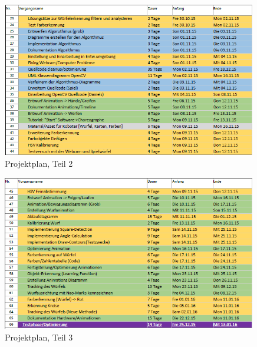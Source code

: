 \begin{appendix}
            \begin{figure}[ht]
                \centering
                \includegraphics[width=0.99\textwidth]{src/pictures/planung2.png}
                \caption{Projektplan, Teil 2}
                \label{img:planung2}
            \end{figure}

            \begin{figure}[ht]
                \centering
                \includegraphics[width=0.99\textwidth]{src/pictures/planung3.png}
                \caption{Projektplan, Teil 3}
                \label{img:planung3}
            \end{figure}


\end{appendix}
